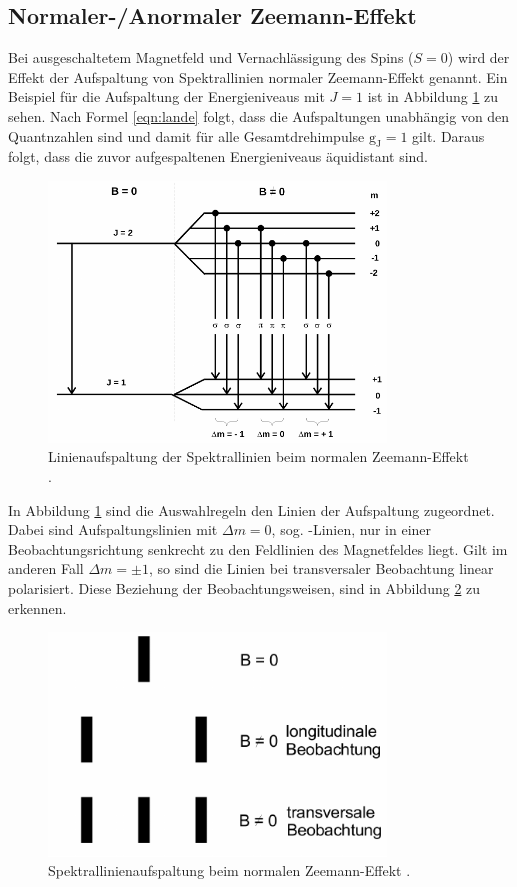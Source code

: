 \subsection{Normaler-/Anormaler Zeemann-Effekt}
\label{sec:Zeemann}
Bei ausgeschaltetem Magnetfeld und Vernachlässigung des Spins ($S = \num{0}$) wird
der Effekt der Aufspaltung von Spektrallinien normaler Zeemann-Effekt genannt.
Ein Beispiel für die Aufspaltung der Energieniveaus mit $J = 1$ ist in Abbildung
\ref{abb:normal} zu sehen. Nach Formel \ref{eqn:lande} folgt, dass die Aufspaltungen
unabhängig von den Quantnzahlen sind und damit für alle Gesamtdrehimpulse $\text{g}_\text{J} = 1$
gilt. Daraus folgt, dass die zuvor aufgespaltenen Energieniveaus äquidistant sind.
\begin{figure}[htb]
  \centering
  \includegraphics[width=0.8\textwidth]{images/V27_3.pdf}
  \caption{Linienaufspaltung der Spektrallinien beim normalen Zeemann-Effekt
  \cite{anleitung}.}
  \label{abb:normal}
\end{figure}
In Abbildung \ref{abb:normal} sind die Auswahlregeln den Linien der Aufspaltung
zugeordnet.
Dabei sind Aufspaltungslinien mit $\Delta m = \num{0}$, sog. \pi-Linien, nur in
einer Beobachtungsrichtung senkrecht zu den Feldlinien des Magnetfeldes liegt.
Gilt im anderen Fall $\Delta m = \pm 1$, so sind die Linien bei transversaler
Beobachtung linear polarisiert. Diese Beziehung der Beobachtungsweisen, sind
in Abbildung \ref{abb:spektral} zu erkennen.
\begin{figure}[htb]
  \centering
  \includegraphics[width=0.8\textwidth]{images/V27_4.pdf}
  \caption{Spektrallinienaufspaltung beim normalen Zeemann-Effekt \cite{anleitung}.}
  \label{abb:spektral}
\end{figure}

